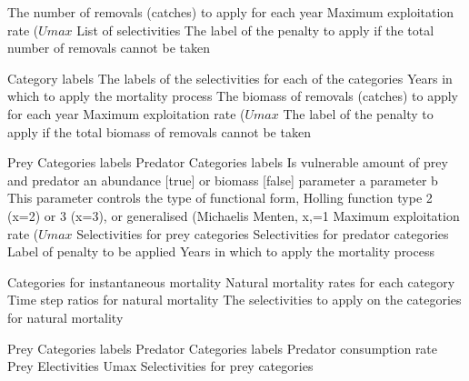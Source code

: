  {The number of removals (catches) to apply for each year}
 {Maximum exploitation rate ($Umax$}
 {List of selectivities}
 {The label of the penalty to apply if the total number of removals cannot be taken}
\par\textbf{}\par
{} {Category labels}
 {The labels of the selectivities for each of the categories}
 {Years in which to apply the mortality process}
 {The biomass of removals (catches) to apply for each year}
 {Maximum exploitation rate ($Umax$}
 {The label of the penalty to apply if the total biomass of removals cannot be taken}
\par\textbf{}\par
{} {Prey Categories labels}
 {Predator Categories labels}
 {Is vulnerable amount of prey and predator an abundance [true] or biomass [false]}
 {parameter a}
 {parameter b}
 {This parameter controls the type of functional form, Holling function type 2 (x=2) or 3 (x=3), or generalised (Michaelis Menten, x,=1}
 {Maximum exploitation rate ($Umax$}
 {Selectivities for prey categories}
 {Selectivities for predator categories}
 {Label of penalty to be applied}
 {Years in which to apply the mortality process}
\par\textbf{}\par
{} {Categories for instantaneous mortality}
 {Natural mortality rates for each category}
 {Time step ratios for natural mortality}
 {The selectivities to apply on the categories for natural mortality}
\par\textbf{}\par
{} {Prey Categories labels}
 {Predator Categories labels}
 {Predator consumption rate}
 {Prey Electivities}
 {Umax}
 {Selectivities for prey categories}

